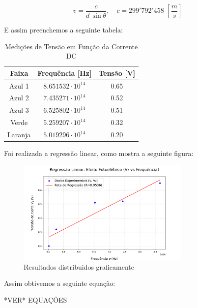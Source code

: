 \documentclass[10pt,twocolumn,letterpaper]{article}
\begin{document}
\vspace{-.25cm}

\begin{equation*}
    v = \frac{c}{d\,\sin{\theta}}, \quad c = 299'792'458 \,\, \left[\frac{m}{s}\right]
\end{equation*}

\noindent E assim preenchemos a seguinte tabela:

\begin{table}[htbp]
    \centering
    \caption{Medições de Tensão em Função da Corrente DC}
    \label{tab:medicoes_tensao}
    \vspace{0.25cm}
    \begin{tabular}{ccc}
        \hline
        \rule{0pt}{3ex}\textbf{Faixa} & \textbf{Frequência} [Hz] & \textbf{Tensão} [V]\\[5pt]
        \hline
        \rule{0pt}{3ex}Azul 1 & $8.651532\cdot 10^{14}$ & 0.65 \\
        Azul 2 & $7.435271\cdot 10^{14}$ & 0.52 \\
        Azul 3 & $6.525802\cdot 10^{14}$ & 0.51 \\
        Verde & $5.259207\cdot 10^{14}$ & 0.32 \\
        Laranja & $5.019296\cdot 10^{14}$ & 0.20 \\[5pt]
        \hline
    \end{tabular}
\end{table}

\hspace{1cm}  Foi realizada a regressão linear, como mostra a seguinte figura:

\begin{figure}[h]
    \centering
    \includegraphics[width=8.5cm]{efeito_fotoeletrico_regressao.pdf}
    \caption{Resultados distribuidos graficamente}
    \label{fig:label}
\end{figure}

\noindent Assim obtivemos a seguinte equação:

{\Huge \color{red} *VER* EQUAÇÕES}
\end{document}
